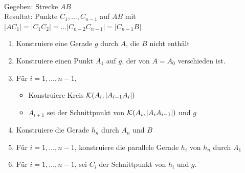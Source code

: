 \begin{konst}\ \\
    Gegeben: Strecke $AB$\\
    Resultat: Punkte $C_1, \dots, C_{n-1}$ auf $AB$ mit $|AC_1|=|C_1C_2|=\dots |C_{n-2} C_{n-1}| =
    |C_{n-1} B|$
    \renewcommand{\labelenumi}{\arabic{enumi}.} %
    \begin{enumerate}
        \item Konstruiere eine Gerade $g$ durch $A$, die $B$ nicht enthält
        \item Konstruiere einen Punkt $A_1$ auf $g$, der von $A=A_0$ verschieden ist.
        \item Für $i=1, \dots, {n-1}$,
        \begin{itemize}
            \item Konstruiere Kreis ${\mathcal K}(A_i, |A_{i-1} A_i|)$
            \item $A_{i+1}$ sei der Schnittpunkt von ${\mathcal K}(A_i, |A_{i} A_{i-1}|)$ und $g$
        \end{itemize}
        \item Konstruiere die Gerade $h_n$ durch $A_n$ und $B$
        \item Für $i=1,\dots, {n-1}$, konstruiere die parallele Gerade $h_i$ von $h_n$ durch $A_1$
        \item Für $i=1, \ldots, {n-1}$, sei $C_i$ der Schnittpunkt von $h_i$ und $g$.
    \end{enumerate}
\end{konst}

